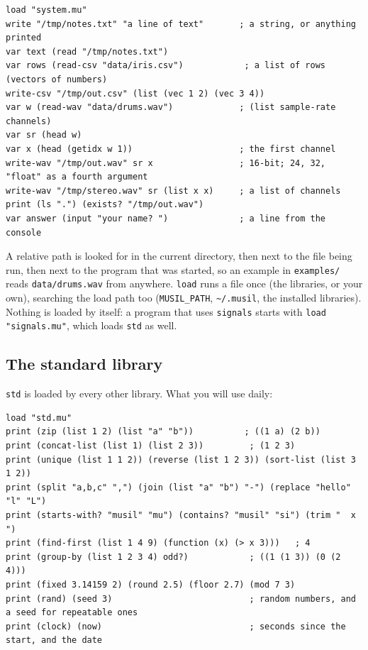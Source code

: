 \documentclass[11pt,a4paper]{article}
\newcommand{\musil}[1]{\lstinline[style=musilinline]{#1}}
\begin{document}
\begin{lstlisting}
load "system.mu"
write "/tmp/notes.txt" "a line of text"       ; a string, or anything printed
var text (read "/tmp/notes.txt")
var rows (read-csv "data/iris.csv")            ; a list of rows (vectors of numbers)
write-csv "/tmp/out.csv" (list (vec 1 2) (vec 3 4))
var w (read-wav "data/drums.wav")             ; (list sample-rate channels)
var sr (head w)
var x (head (getidx w 1))                     ; the first channel
write-wav "/tmp/out.wav" sr x                 ; 16-bit; 24, 32, "float" as a fourth argument
write-wav "/tmp/stereo.wav" sr (list x x)     ; a list of channels
print (ls ".") (exists? "/tmp/out.wav")
var answer (input "your name? ")              ; a line from the console
\end{lstlisting}

A relative path is looked for in the current directory, then next to the file being run,
then next to the program that was started, so an example in \texttt{examples/} reads
\texttt{data/drums.wav} from anywhere. \musil{load} runs a file once (the libraries, or your
own), searching the load path too (\texttt{MUSIL\_PATH}, \texttt{\textasciitilde/.musil},
the installed libraries). Nothing is loaded by itself: a program that uses \texttt{signals}
starts with \musil{load "signals.mu"}, which loads \texttt{std} as well.

\subsection{The standard library}

\texttt{std} is loaded by every other library. What you will use daily:

\begin{lstlisting}
load "std.mu"
print (zip (list 1 2) (list "a" "b"))          ; ((1 a) (2 b))
print (concat-list (list 1) (list 2 3))         ; (1 2 3)
print (unique (list 1 1 2)) (reverse (list 1 2 3)) (sort-list (list 3 1 2))
print (split "a,b,c" ",") (join (list "a" "b") "-") (replace "hello" "l" "L")
print (starts-with? "musil" "mu") (contains? "musil" "si") (trim "  x  ")
print (find-first (list 1 4 9) (function (x) (> x 3)))   ; 4
print (group-by (list 1 2 3 4) odd?)            ; ((1 (1 3)) (0 (2 4)))
print (fixed 3.14159 2) (round 2.5) (floor 2.7) (mod 7 3)
print (rand) (seed 3)                           ; random numbers, and a seed for repeatable ones
print (clock) (now)                             ; seconds since the start, and the date
\end{lstlisting}
\end{document}
